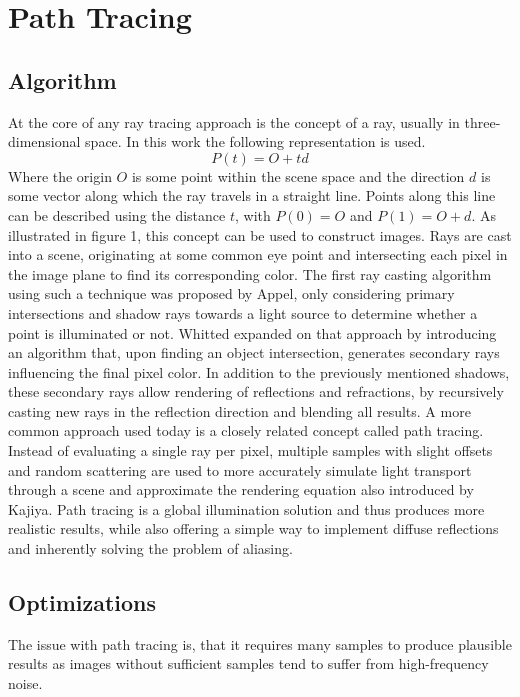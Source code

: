 \section{Path Tracing}
\subsection{Algorithm}
At the core of any ray tracing approach is the concept of a ray, usually in three-dimensional space. In this work the following representation is used.
\[P(t)=O+td\]
Where the origin $O$ is some point within the scene space and the direction $d$ is some vector along which the ray travels in a straight line. Points along this line can be described using the distance $t$, with $P(0)=O$ and $P(1)=O+d$. 
As illustrated in figure 1, this concept can be used to construct images. Rays are cast into a scene, originating at some common eye point and intersecting each pixel in the image plane to find its corresponding color. The first ray casting algorithm using such a technique was proposed by Appel\cite{appel1968}, only considering primary intersections and shadow rays towards a light source to determine whether a point is illuminated or not. Whitted\cite{whitted_improved_1980} expanded on that approach by introducing an algorithm that, upon finding an object intersection, generates secondary rays influencing the final pixel color. In addition to the previously mentioned shadows, these secondary rays allow rendering of reflections and refractions, by recursively casting new rays in the reflection direction and blending all results. 
A more common approach used today is a closely related concept called path tracing\cite{kajiya_rendering_1986}. Instead of evaluating a single ray per pixel, multiple samples with slight offsets and random scattering are used to more accurately simulate light transport through a scene and approximate the rendering equation also introduced by Kajiya. Path tracing is a global illumination solution and thus produces more realistic results, while also offering a simple way to implement diffuse reflections and inherently solving the problem of aliasing. 
\subsection{Optimizations}
The issue with path tracing is, that it requires many samples to produce plausible results as images without sufficient samples tend to suffer from high-frequency noise. 